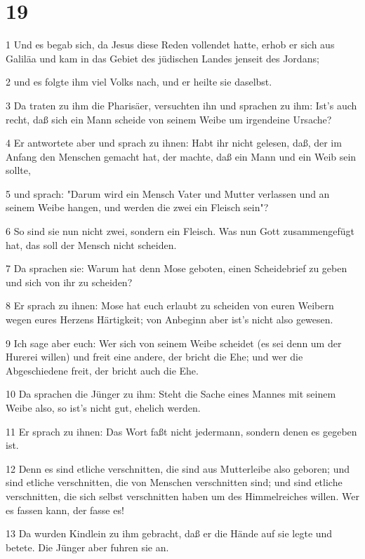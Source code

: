 \chapter{19}

\par 1 Und es begab sich, da Jesus diese Reden vollendet hatte, erhob er sich aus Galiläa und kam in das Gebiet des jüdischen Landes jenseit des Jordans;
\par 2 und es folgte ihm viel Volks nach, und er heilte sie daselbst.
\par 3 Da traten zu ihm die Pharisäer, versuchten ihn und sprachen zu ihm: Ist's auch recht, daß sich ein Mann scheide von seinem Weibe um irgendeine Ursache?
\par 4 Er antwortete aber und sprach zu ihnen: Habt ihr nicht gelesen, daß, der im Anfang den Menschen gemacht hat, der machte, daß ein Mann und ein Weib sein sollte,
\par 5 und sprach: "Darum wird ein Mensch Vater und Mutter verlassen und an seinem Weibe hangen, und werden die zwei ein Fleisch sein"?
\par 6 So sind sie nun nicht zwei, sondern ein Fleisch. Was nun Gott zusammengefügt hat, das soll der Mensch nicht scheiden.
\par 7 Da sprachen sie: Warum hat denn Mose geboten, einen Scheidebrief zu geben und sich von ihr zu scheiden?
\par 8 Er sprach zu ihnen: Mose hat euch erlaubt zu scheiden von euren Weibern wegen eures Herzens Härtigkeit; von Anbeginn aber ist's nicht also gewesen.
\par 9 Ich sage aber euch: Wer sich von seinem Weibe scheidet (es sei denn um der Hurerei willen) und freit eine andere, der bricht die Ehe; und wer die Abgeschiedene freit, der bricht auch die Ehe.
\par 10 Da sprachen die Jünger zu ihm: Steht die Sache eines Mannes mit seinem Weibe also, so ist's nicht gut, ehelich werden.
\par 11 Er sprach zu ihnen: Das Wort faßt nicht jedermann, sondern denen es gegeben ist.
\par 12 Denn es sind etliche verschnitten, die sind aus Mutterleibe also geboren; und sind etliche verschnitten, die von Menschen verschnitten sind; und sind etliche verschnitten, die sich selbst verschnitten haben um des Himmelreiches willen. Wer es fassen kann, der fasse es!
\par 13 Da wurden Kindlein zu ihm gebracht, daß er die Hände auf sie legte und betete. Die Jünger aber fuhren sie an.

